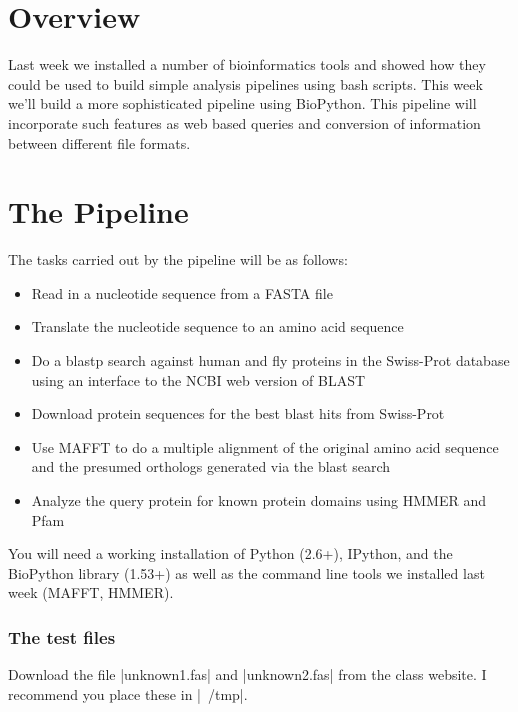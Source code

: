 
\section*{Overview}

Last week we installed a number of bioinformatics tools and showed how they could be used to build simple analysis pipelines using bash scripts.  This week we'll build a more sophisticated pipeline using BioPython.  This pipeline will incorporate such features as web based queries and conversion of information between different file formats.

\section*{The Pipeline}


The tasks carried out by the pipeline will be as follows:

\begin{itemize}

\item Read in a nucleotide sequence from a FASTA file
\item Translate the nucleotide sequence to an amino acid sequence
\item Do a blastp search against human and fly proteins in the Swiss-Prot database using an interface to the NCBI web version of BLAST
\item Download protein sequences for the best blast hits from Swiss-Prot
\item Use MAFFT to do a multiple alignment of the original amino acid sequence and the presumed orthologs generated via the blast search
\item Analyze the query protein for known protein domains using HMMER and Pfam

\end{itemize} 


You will need a working installation of Python (2.6+), IPython, and the BioPython library (1.53+) as well as the command line tools we installed last week (MAFFT, HMMER). 

\subsubsection*{The test files}

Download the file |unknown1.fas| and |unknown2.fas| from the class website. I recommend you place these in |~/tmp|.


